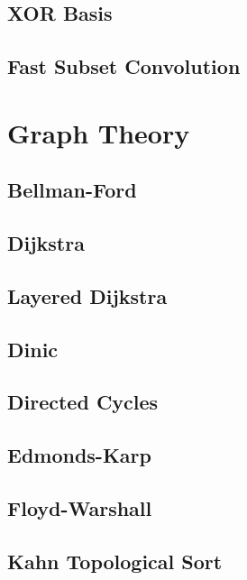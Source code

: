 \documentclass[10pt,letterpaper,landscape,twocolumn]{article}
\begin{document}
\subsection{XOR Basis}

\subsection{Fast Subset Convolution}


\section{Graph Theory}
\subsection{Bellman-Ford}

\subsection{Dijkstra}

\subsection{Layered Dijkstra}

\subsection{Dinic}

\subsection{Directed Cycles}

\subsection{Edmonds-Karp}

\subsection{Floyd-Warshall}

\subsection{Kahn Topological Sort}

\end{document}
